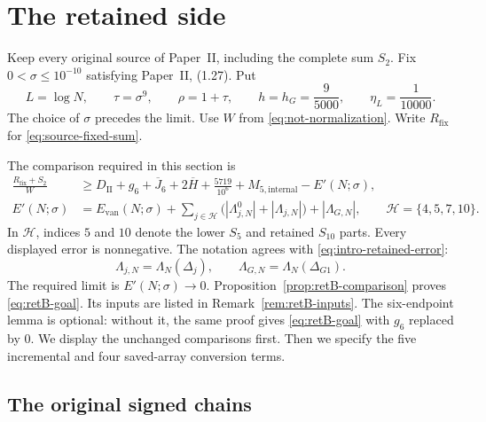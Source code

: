 \section{The retained side}\label{sec:retained-side}

Keep every original source of Paper~II, including the complete sum $S_2$.
Fix $0<\sigma\le10^{-10}$ satisfying Paper~II, (1.27). Put
\begin{equation}\label{eq:retB-parameters}
 L=\log N,\qquad \tau=\sigma^9,\qquad \rho=1+\tau,
 \qquad h=h_G=\frac9{5000},\qquad \eta_L=\frac1{10000}.
\end{equation}
The choice of $\sigma$ precedes the limit.
Use $W$ from \eqref{eq:not-normalization}.
Write $R_{\mathrm{fix}}$ for \eqref{eq:source-fixed-sum}.

The comparison required in this section is
\begin{equation}\label{eq:retB-goal}
\begin{aligned}
 \frac{R_{\mathrm{fix}}+S_2}{W}
 &\ge D_{\mathrm{II}}+g_6+\overline J_6+2\overline H
       +\frac{5719}{10^6}+M_{5,\mathrm{internal}}-E'(N;\sigma),\\
 E'(N;\sigma)
 &=E_{\mathrm{van}}(N;\sigma)
   +\sum_{j\in\mathcal H}\bigl(|\Lambda^0_{j,N}|+|\Lambda_{j,N}|\bigr)
   +|\Lambda_{G,N}|,\qquad
 \mathcal H=\{4,5,7,10\}.
\end{aligned}
\end{equation}
In $\mathcal H$, indices $5$ and $10$ denote the lower $S_5$
and retained $S_{10}$ parts.
Every displayed error is nonnegative.
The notation agrees with \eqref{eq:intro-retained-error}:
\begin{equation}\label{eq:retB-Lambda-alias}
 \Lambda_{j,N}=\Lambda_N(\Delta_j),\qquad
 \Lambda_{G,N}=\Lambda_N(\Delta_{G1}).
\end{equation}
The required limit is $E'(N;\sigma)\to0$.
Proposition~\ref{prop:retB-comparison} proves \eqref{eq:retB-goal}.
Its inputs are listed in Remark~\ref{rem:retB-inputs}. The six-endpoint
lemma is optional: without it, the
same proof gives \eqref{eq:retB-goal} with $g_6$ replaced by $0$.
We display the unchanged comparisons first.
Then we specify the five incremental and four saved-array conversion terms.

\subsection{The original signed chains}

